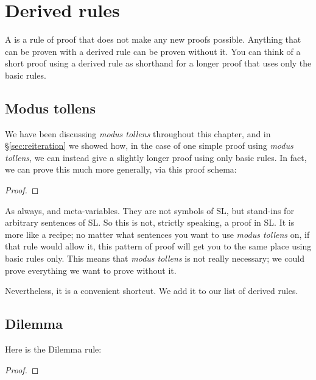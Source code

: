 \section{Derived rules}

A  is a rule of proof that does not make any new proofs possible. Anything that can be proven with a derived rule can be proven without it. You can think of a short proof using a derived rule as shorthand for a longer proof that uses only the basic rules. 

\subsection{Modus tollens}

We have been discussing \emph{modus tollens} throughout this chapter, and in \S\ref{sec:reiteration} we showed how, in the case of one simple proof using \emph{modus tollens}, we can instead give a slightly longer proof using only basic rules. In fact, we can prove this much more generally, via this proof schema:



\begin{proof}
	 \want{\enot \metaB{}}
	\open
		 
	\close
\end{proof}

As always,  \metaA{} and \metaB{} meta-variables. They are not symbols of SL, but stand-ins for arbitrary sentences of SL. So this is not, strictly speaking, a proof in SL. It is more like a recipe; no matter what sentences you want to use \emph{modus tollens} on, if that rule would allow it, this pattern of proof will get you to the same place using basic rules only. This means that \emph{modus tollens} is not really necessary; we could prove everything we want to prove without it.

Nevertheless, it is a convenient shortcut. We add it to our list of derived rules.

\subsection{Dilemma}


Here is the Dilemma rule:

\begin{proof}
	 
\end{proof}

